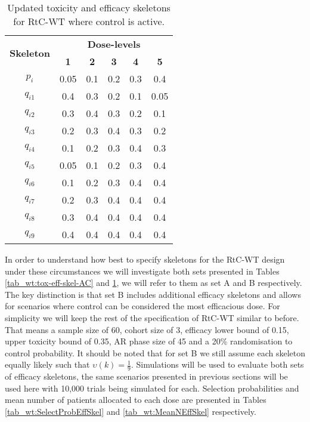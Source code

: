    \begin{table}[!h]
 	\centering
 	\caption{Updated toxicity and efficacy skeletons for RtC-WT where control is active.}
 	\label{tab_wt:tox-eff-skel-ACadditional}
 	\begin{tabular}{c|ccccc}
 		\hline
 		\multicolumn{1}{c|}{\multirow{2}{*}{\textbf{Skeleton}}} & \multicolumn{5}{c}{\textbf{Dose-levels}}                       \\
 		\multicolumn{1}{c|}{}                                   & \textbf{1} & \textbf{2} & \textbf{3} & \textbf{4} & \textbf{5} \\ \hline
 		$p_i$    & 0.05 & 0.1 & 0.2 & 0.3 & 0.4 \\
 		$q_{i1}$ & 0.4 & 0.3 & 0.2 & 0.1 & 0.05 \\
 		$q_{i2}$ & 0.3 & 0.4 & 0.3 & 0.2 & 0.1 \\
 		$q_{i3}$ & 0.2 & 0.3 & 0.4 & 0.3 & 0.2 \\
 		$q_{i4}$ & 0.1 & 0.2 & 0.3 & 0.4 & 0.3 \\
 		$q_{i5}$ & 0.05 & 0.1 & 0.2 & 0.3 & 0.4 \\
 		$q_{i6}$ & 0.1 & 0.2 & 0.3 & 0.4 & 0.4 \\
 		$q_{i7}$ & 0.2 & 0.3 & 0.4 & 0.4 & 0.4 \\
 		$q_{i8}$ & 0.3 & 0.4 & 0.4 & 0.4 & 0.4 \\
 		$q_{i9}$ & 0.4 & 0.4 & 0.4 & 0.4 & 0.4 \\ \hline
 	\end{tabular}
 \end{table}
 
In order to understand how best to specify skeletons for the RtC-WT design under these circumstances we will investigate both sets presented in Tables \ref{tab_wt:tox-eff-skel-AC} and \ref{tab_wt:tox-eff-skel-ACadditional}, we will refer to them as set A and B respectively. The key distinction is that set B includes additional efficacy skeletons and allows for scenarios where control can be considered the most efficacious dose. For simplicity we will keep the rest of the specification of RtC-WT similar to before. That means a sample size of 60, cohort size of 3, efficacy lower bound of 0.15, upper toxicity bound of 0.35, AR phase size of 45 and a 20\% randomisation to control probability. It should be noted that for set B we still assume each skeleton equally likely such that $\upsilon(k) = \frac{1}{9}$. Simulations will be used to evaluate both sets of efficacy skeletons, the same scenarios presented in previous sections will be used here with 10,000 trials being simulated for each. Selection probabilities and mean number of patients allocated to each dose are presented in Tables \ref{tab_wt:SelectProbEffSkel} and \ref{tab_wt:MeanNEffSkel} respectively. 

